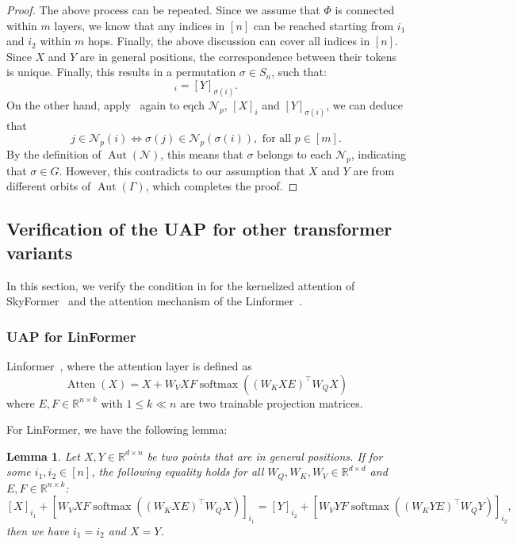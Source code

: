 \documentclass{article}
\newtheorem{lemma}{Lemma}
\begin{document}
\begin{proof}
The above process can be repeated. Since we assume that $\Phi$ is connected within $m$ layers, we know that any indices in $[n]$ can be reached starting from $i_1$ and $i_2$ within $m$ hops. Finally, the above discussion can cover all indices in $[n]$. Since $X$ and $Y$ are in general positions, the correspondence between their tokens is unique.
Finally, this results in a permutation $\sigma\in S_n$, such that:
\begin{equation}
    [X]_i=[Y]_{\sigma(i)}.
\end{equation}
On the other hand, apply~ again to eqch $\mathcal N_p$, $[X]_i$ and $[Y]_{\sigma(i)}$, we can deduce that
\begin{equation}
     j\in\mathcal N_p(i) \Leftrightarrow \sigma(j)\in\mathcal N_p(\sigma(i)), \text{ for all } p\in [m].
\end{equation}
By the definition of $\operatorname{Aut}(\mathcal N)$, this means that $\sigma$ belongs to each $\mathcal N_{ p}$, indicating that $\sigma \in G$.
However, this contradicts to our assumption that $X$ and $Y$ are from different orbits of $\operatorname{Aut}(\Gamma)$, which completes the proof.
\end{proof}

\subsection{Verification of the UAP for other transformer variants}
\label{sec:other_transformer}
In this section, we verify the condition in  for the kernelized attention of SkyFormer~\cite{chen2021skyformer} and the attention mechanism of the Linformer~\cite{wang2020linformer}.

\subsubsection{UAP for LinFormer}
Linformer~\cite{wang2020linformer}, where the attention layer is defined as
    \begin{equation}
        \operatorname{Atten}(X)=X + W_V X {F}\operatorname{softmax}((W_K X{E})^\top W_Q X)
\end{equation}
where $E, F\in \mathbb R^{n\times k}$ with $1\le k\ll n$ are two trainable projection matrices.

For LinFormer, we have the following lemma:
\begin{lemma}
    Let $X,Y\in \mathbb R^{d\times n}$ be two points that are in general positions. If for some $i_1,i_2\in [n]$, the following equality holds for all $W_Q, W_K, W_V\in\mathbb R^{d\times d}$ and $E, F\in\mathbb R^{n\times k}$:
    \begin{equation}
        \label{eq:lem_equal_atten_linformer}
        [X]_{i_1}+[W_V X {F}\operatorname{softmax}((W_K X{E})^\top W_Q X)]_{i_1} = [Y]_{i_2}+[W_V Y {F}\operatorname{softmax}((W_K Y{E})^\top W_Q Y)]_{i_2},
    \end{equation}
     then we have $i_1=i_2$ and $X=Y$.
\end{lemma}
\end{document}
